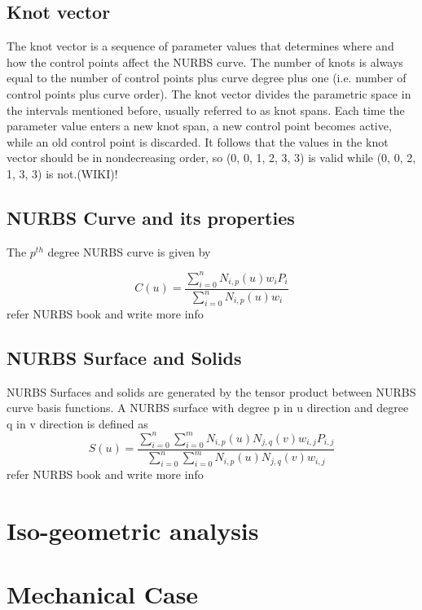 \documentclass[12pt]{article}
\begin{document}
\subsection{Knot vector }
The knot vector is a sequence of parameter values that determines where and how the control points affect the NURBS curve. The number of knots is always equal to the number of control points plus curve degree plus one (i.e. number of control points plus curve order). The knot vector divides the parametric space in the intervals mentioned before, usually referred to as knot spans. Each time the parameter value enters a new knot span, a new control point becomes active, while an old control point is discarded. It follows that the values in the knot vector should be in nondecreasing order, so (0, 0, 1, 2, 3, 3) is valid while (0, 0, 2, 1, 3, 3) is not.(WIKI)!
\subsection{NURBS Curve and its properties }
The $p^{th}$ degree NURBS curve is given by

\begin{equation}
C(u) = \frac{\sum_{i=0}^{n}N_{i,p}(u)w_{i}P_{i}}{\sum_{i=0}^{n}N_{i,p}(u)w_{i}}
\end{equation}
refer NURBS book and write more info
\subsection{NURBS Surface and Solids }
NURBS Surfaces and solids are generated by the tensor product between NURBS curve basis functions.
A NURBS surface with degree p in u direction and degree q in v direction is defined as
\begin{equation}
S(u) = \frac{\sum_{i=0}^{n}\sum_{i=0}^{m}N_{i,p}(u)N_{j,q}(v)w_{i,j}P_{i,j}}{\sum_{i=0}^{n}\sum_{i=0}^{m}N_{i,p}(u)N_{j,q}(v)w_{i,j}}
\end{equation}
refer NURBS book and write more info
\section{Iso-geometric analysis}


\section{Mechanical Case}
\end{document}
